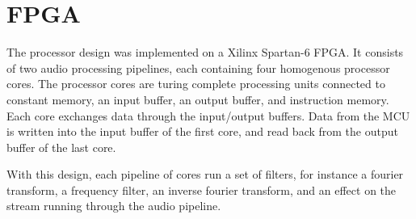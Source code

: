 \FloatBarrier
\section{FPGA}\label{chapter:fpga}

The processor design was implemented on a Xilinx Spartan-6 FPGA. It consists of
two audio processing pipelines, each containing four homogenous processor cores.
The processor cores are turing complete processing units connected to
constant memory, an input buffer, an output buffer, and instruction memory.
Each core exchanges data through the input/output buffers. Data from the MCU
is written into the input buffer of the first core, and read back from the
output buffer of the last core.

With this design, each pipeline of cores run a set of filters, for instance
a fourier transform, a frequency filter, an inverse fourier transform, and an
effect on the stream running through the audio pipeline.







